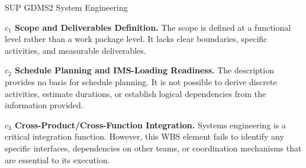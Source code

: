 %
\begin{frame}{SUP GDMS2 System Engineering}
\begin{minipage}{0.90\textwidth}
\raggedright
\fontsize{8}{9.5}\selectfont
\textbf{\(c_1\) Scope and Deliverables Definition.}
The scope is defined at a functional level rather than a work package level. It lacks clear boundaries, specific activities, and measurable deliverables.\par\vspace{0.6em}
\textbf{\(c_2\) Schedule Planning and IMS-Loading Readiness.}
The description provides no basis for schedule planning. It is not possible to derive discrete activities, estimate durations, or establish logical dependencies from the information provided.\par\vspace{0.6em}
\textbf{\(c_3\) Cross-Product/Cross-Function Integration.}
Systems engineering is a critical integration function. However, this WBS element fails to identify any specific interfaces, dependencies on other teams, or coordination mechanisms that are essential to its execution.\par\vspace{0.6em}
\end{minipage}
\end{frame}

\endinput

